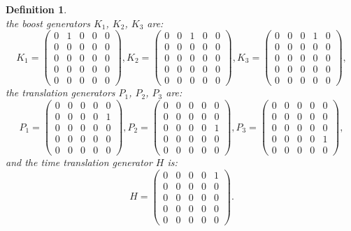 \documentclass{amsart}
\newtheorem{definition}[theorem]{Definition}
\theoremstyle{remark}
\begin{document}
\begin{definition}
\[  \]
  the boost generators $K_1$, $K_2$, $K_3$ are:
  \[
  K_1 =
  \begin{pmatrix}
    0 & 1 & 0 & 0 & 0 \\
    0 & 0 & 0 & 0 & 0 \\
    0 & 0 & 0 & 0 & 0 \\
    0 & 0 & 0 & 0 & 0 \\
    0 & 0 & 0 & 0 & 0
  \end{pmatrix},
  K_2 =
  \begin{pmatrix}
    0 & 0 & 1 & 0 & 0 \\
    0 & 0 & 0 & 0 & 0 \\
    0 & 0 & 0 & 0 & 0 \\
    0 & 0 & 0 & 0 & 0 \\
    0 & 0 & 0 & 0 & 0
  \end{pmatrix},
  K_3 =
  \begin{pmatrix}
    0 & 0 & 0 & 1 & 0 \\
    0 & 0 & 0 & 0 & 0 \\
    0 & 0 & 0 & 0 & 0 \\
    0 & 0 & 0 & 0 & 0 \\
    0 & 0 & 0 & 0 & 0
  \end{pmatrix},
  \]
  the translation generators $P_1$, $P_2$, $P_3$ are:
  \[
  P_1 =
  \begin{pmatrix}
    0 & 0 & 0 & 0 & 0 \\
    0 & 0 & 0 & 0 & 1 \\
    0 & 0 & 0 & 0 & 0 \\
    0 & 0 & 0 & 0 & 0 \\
    0 & 0 & 0 & 0 & 0
  \end{pmatrix},
  P_2 =
  \begin{pmatrix}
    0 & 0 & 0 & 0 & 0 \\
    0 & 0 & 0 & 0 & 0 \\
    0 & 0 & 0 & 0 & 1 \\
    0 & 0 & 0 & 0 & 0 \\
    0 & 0 & 0 & 0 & 0
  \end{pmatrix},
  P_3 =
  \begin{pmatrix}
    0 & 0 & 0 & 0 & 0 \\
    0 & 0 & 0 & 0 & 0 \\
    0 & 0 & 0 & 0 & 0 \\
    0 & 0 & 0 & 0 & 1 \\
    0 & 0 & 0 & 0 & 0
  \end{pmatrix},
  \]
  and the time translation generator $H$ is:
  \[
  H =
  \begin{pmatrix}
    0 & 0 & 0 & 0 & 1 \\
    0 & 0 & 0 & 0 & 0 \\
    0 & 0 & 0 & 0 & 0 \\
    0 & 0 & 0 & 0 & 0 \\
    0 & 0 & 0 & 0 & 0
  \end{pmatrix}.
  \]
\end{definition}
\end{document}

